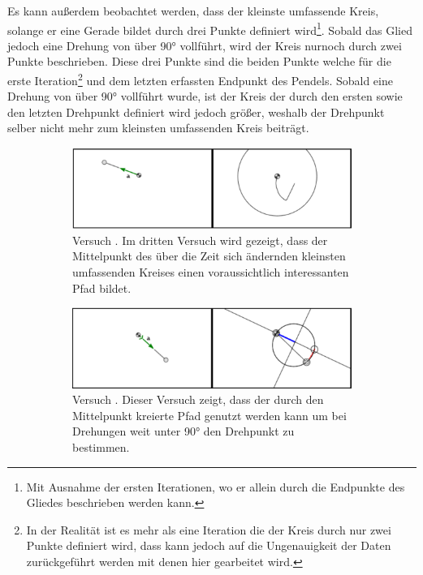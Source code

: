 Es kann au{\ss}erdem beobachtet werden, dass der kleinste umfassende Kreis, solange er eine Gerade bildet durch drei Punkte definiert wird\footnote{Mit Ausnahme der ersten Iterationen, wo er allein durch die Endpunkte des Gliedes beschrieben werden kann.}.
Sobald das Glied jedoch eine Drehung von über 90° vollführt, wird der Kreis nurnoch durch zwei Punkte beschrieben.
Diese drei Punkte sind die beiden Punkte welche für die erste Iteration\footnote{In der Realität ist es mehr als eine Iteration die der Kreis durch nur zwei Punkte definiert wird, dass kann jedoch auf die Ungenauigkeit der Daten zurückgeführt werden mit denen hier gearbeitet wird.} und dem letzten erfassten Endpunkt des Pendels.
Sobald eine Drehung von über 90° vollführt wurde, ist der Kreis der durch den ersten sowie den letzten Drehpunkt definiert wird jedoch grö{\ss}er, weshalb der Drehpunkt selber nicht mehr zum kleinsten umfassenden Kreis beiträgt.


\begin{figure}
    \centering
    \begin{subfigure}[t]{0.45\textwidth}
        \includegraphics[width=\textwidth]{gfx/pendel1_3.png}
        \caption{Versuch . Im dritten Versuch wird gezeigt, dass der Mittelpunkt des über die Zeit sich ändernden kleinsten umfassenden Kreises einen voraussichtlich interessanten Pfad bildet.}\label{fig:pendel1_3}
    \end{subfigure}
    \begin{subfigure}[t]{0.45\textwidth}
        \includegraphics[width=\textwidth]{gfx/pendel1_4.png}
        \caption{Versuch . Dieser Versuch zeigt, dass der durch den Mittelpunkt kreierte Pfad genutzt werden kann um bei Drehungen weit unter 90° den Drehpunkt zu bestimmen.}\label{fig:pendel1_4}
    \end{subfigure}
    \caption[Versuche  und ]{}
    \label{fig:pendel1_3_4}
\end{figure}

